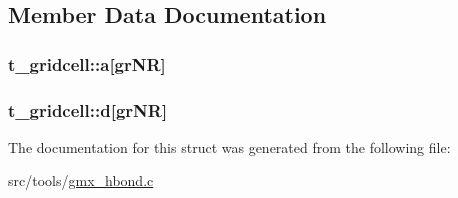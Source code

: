 \subsection{\-Member \-Data \-Documentation}
\hypertarget{structt__gridcell_a0a3f526a7b02a8775ecaba67cde87940}{
\subsubsection[{a}]{ {\bf t\-\_\-gridcell\-::a}\mbox{[}{\bf gr\-N\-R}\mbox{]}}}\label{structt__gridcell_a0a3f526a7b02a8775ecaba67cde87940}
\hypertarget{structt__gridcell_aaf1f45edf6e5343c7858a7c21da446c9}{
\subsubsection[{d}]{ {\bf t\-\_\-gridcell\-::d}\mbox{[}{\bf gr\-N\-R}\mbox{]}}}\label{structt__gridcell_aaf1f45edf6e5343c7858a7c21da446c9}


\-The documentation for this struct was generated from the following file\-:\begin{DoxyCompactItemize}
\item 
src/tools/\hyperlink{gmx__hbond_8c}{gmx\-\_\-hbond.\-c}\end{DoxyCompactItemize}

